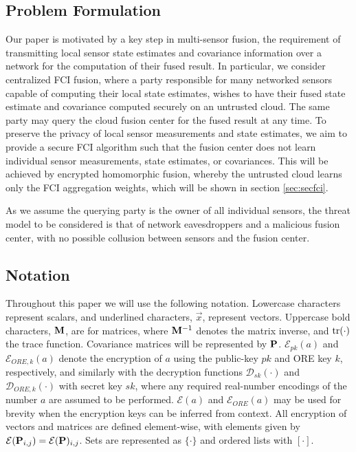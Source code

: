 \documentclass[letterpaper, 10 pt, journal, twoside]{ieeetran}  %
\begin{document}
\subsection{Problem Formulation} \label{subsec:problem_formulation}
Our paper is motivated by a key step in multi-sensor fusion, the requirement of transmitting local sensor state estimates and covariance information over a network for the computation of their fused result. In particular, we consider centralized FCI fusion, where a party responsible for many networked sensors capable of computing their local state estimates, wishes to have their fused state estimate and covariance computed securely on an untrusted cloud. The same party may query the cloud fusion center for the fused result at any time. To preserve the privacy of local sensor measurements and state estimates, we aim to provide a secure FCI algorithm such that the fusion center does not learn individual sensor measurements, state estimates, or covariances. This will be achieved by encrypted homomorphic fusion, whereby the untrusted cloud learns only the FCI aggregation weights, which will be shown in section \ref{sec:secfci}.

As we assume the querying party is the owner of all individual sensors, the threat model to be considered is that of network eavesdroppers and a malicious fusion center, with no possible collusion between sensors and the fusion center.

\subsection{Notation}
Throughout this paper we will use the following notation. Lowercase characters represent scalars, and underlined characters, $\vec{x}$, represent vectors. Uppercase bold characters, ${{\mathbf{M}}}$, are for matrices, where ${{\mathbf{M}}}^{-1}$ denotes the matrix inverse, and $\operatorname{tr}(\cdot)$ the trace function. Covariance matrices will be represented by ${{\mathbf{P}}}$. $\mathcal{E}_{pk}(a)$ and $\mathcal{E}_{ORE,k}(a)$ denote the encryption of $a$ using the public-key $pk$ and ORE key $k$, respectively, and similarly with the decryption functions $\mathcal{D}_{sk}(\cdot)$ and $\mathcal{D}_{ORE,k}(\cdot)$ with secret key $sk$, where any required real-number encodings of the number $a$ are assumed to be performed. $\mathcal{E}(a)$ and $\mathcal{E}_{ORE}(a)$ may be used for brevity when the encryption keys can be inferred from context. All encryption of vectors and matrices are defined element-wise, with elements given by $\mathcal{E}({{\mathbf{P}}}_{i,j}) = \mathcal{E}({{\mathbf{P}}})_{i,j}$. Sets are represented as $\{\cdot\}$ and ordered lists with $[\cdot]$.
\end{document}
